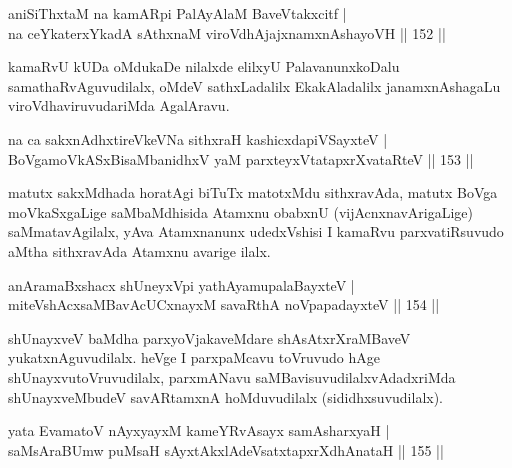 
\begin{shl}
aniSiThxtaM na kamARpi PalAyAlaM BaveVtakxcitf |\\
na ceYkaterxYkadA sAthxnaM viroVdhAjajxnamxnAshayoVH \hfill || 152 ||
\end{shl}

\begin{artha}
kamaRvU kUDa oMdukaDe nilalxde elilxyU PalavanunxkoDalu samathaRvAguvudilalx, oMdeV sathxLadalilx EkakAladalilx janamxnAshagaLu viroVdhaviruvudariMda AgalAravu.
\end{artha}

\begin{shl}
na ca sakxnAdhxtireVkeVNa sithxraH kashicxdapiVSayxteV |\\
BoVgamoVkASxBisaMbanidhxV yaM parxteyxVtatapxrXvataRteV \hfill || 153 ||
\end{shl}

\begin{artha}
matutx sakxMdhada horatAgi biTuTx matotxMdu sithxravAda, matutx BoVga moVkaSxgaLige saMbaMdhisida Atamxnu obabxnU (vijAcnxnavArigaLige) saMmatavAgilalx, yAva Atamxnanunx udedxVshisi I kamaRvu parxvatiRsuvudo aMtha sithxravAda Atamxnu avarige ilalx.
\end{artha}


\begin{shl}
anAramaBxshacx shUneyxV\s pi yathA\s yamupalaBayxteV |\\
miteVshAcxsaMBavAcUCxnayxM savaRthA noVpapadayxteV \hfill || 154 ||
\end{shl}

\begin{artha}
shUnayxveV baMdha parxyoVjakaveMdare shAsAtxrXraMBaveV yukatxnAguvudilalx. heVge I parxpaMcavu toVruvudo hAge shUnayxvutoVruvudilalx, parxmANavu saMBavisuvudilalxvAdadxriMda shUnayxveMbudeV savARtamxnA hoMduvudilalx (sididhxsuvudilalx).
\end{artha}


\begin{shl}
yata EvamatoV nAyxyayxM kameYRvAsayx samAsharxyaH |\\
saMsAraBUmw puMsaH sAyxtAkxlAdeVsatxtapxrXdhAnataH \hfill || 155 ||
\end{shl}

